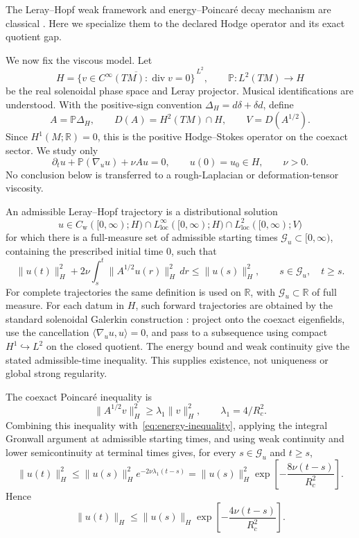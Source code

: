 \documentclass[12pt]{article}
\theoremstyle{definition}
\theoremstyle{remark}
\begin{document}
The Leray--Hopf weak framework and energy--Poincar\'e decay mechanism are
classical \cite{Leray1934,Hopf1950,Temam1997,CheskidovFoias2006}.  Here we
specialize them to the declared Hodge operator and its exact quotient gap.

We now fix the viscous model.  Let
\[
 H=\overline{\{v\in C^\infty(TM):\operatorname{div}v=0\}}^{\,L^2},
 \qquad \mathbb P:L^2(TM)\longrightarrow H
\]
be the real solenoidal phase space and Leray projector.  Musical
identifications are understood.  With the positive-sign convention
$\Delta_H=d\delta+\delta d$, define
\[
 A=\mathbb P\Delta_H,\qquad
 D(A)=H^2(TM)\cap H,\qquad V=D(A^{1/2}).
\]
Since $H^1(M;\mathbb R)=0$, this is the positive Hodge--Stokes operator on
the coexact sector.  We study only
\begin{equation}\label{eq:hodge-ns}
 \partial_tu+\mathbb P(\nabla_u u)+\nu Au=0,
 \qquad u(0)=u_0\in H,\qquad \nu>0.
\end{equation}
No conclusion below is transferred to a rough-Laplacian or
deformation-tensor viscosity.

An admissible Leray--Hopf trajectory is a distributional solution
\[
 u\in C_{\mathrm w}([0,\infty);H)
 \cap L^\infty_{\mathrm{loc}}([0,\infty);H)
 \cap L^2_{\mathrm{loc}}([0,\infty);V)
\]
for which there is a full-measure set of admissible starting times
$\mathcal G_u\subset[0,\infty)$, containing the prescribed initial time
$0$, such that
\begin{equation}\label{eq:energy-inequality}
 \|u(t)\|_H^2+2\nu\int_s^t\|A^{1/2}u(r)\|_H^2\,dr
 \le\|u(s)\|_H^2,
 \qquad s\in\mathcal G_u,\quad t\ge s.
\end{equation}
For complete trajectories the same definition is used on $\mathbb R$, with
$\mathcal G_u\subset\mathbb R$ of full measure.
For each datum in $H$, such forward trajectories are obtained by the
standard solenoidal Galerkin construction \cite{Leray1934,Hopf1950,Temam1997}:
project onto the coexact eigenfields, use the cancellation
$\langle\nabla_u u,u\rangle=0$, and pass to a subsequence using compact
$H^1\hookrightarrow L^2$ on the closed quotient. The energy bound and weak
continuity give the stated admissible-time inequality. This supplies
existence, not uniqueness or global strong regularity.

The coexact Poincar\'e inequality is
\[
 \|A^{1/2}v\|_H^2\ge\lambda_1\|v\|_H^2,
 \qquad\lambda_1=4/R_c^2.
\]
Combining this inequality with~\eqref{eq:energy-inequality}, applying the
integral Gronwall argument at admissible starting times, and using weak
continuity and lower semicontinuity at terminal times gives, for every
$s\in\mathcal G_u$ and $t\ge s$,
\begin{equation}\label{eq:energy-decay}
 \|u(t)\|_H^2\le
 \|u(s)\|_H^2e^{-2\nu\lambda_1(t-s)}
 =\|u(s)\|_H^2\exp\!\left[-\frac{8\nu(t-s)}{R_c^2}\right].
\end{equation}
Hence
\begin{equation}\label{eq:norm-decay}
 \|u(t)\|_H\le
 \|u(s)\|_H\exp\!\left[-\frac{4\nu(t-s)}{R_c^2}\right].
\end{equation}
\end{document}
